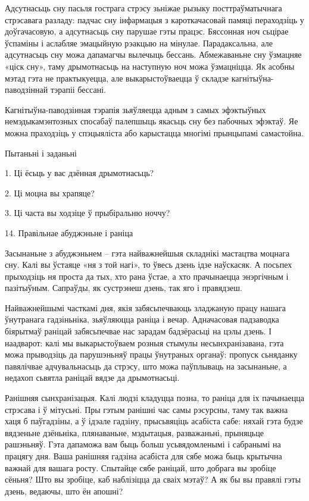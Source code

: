 Адсутнасьць сну пасьля гострага стрэсу зьніжае рызыку посттраўматычнага стрэсавага разладу: падчас сну інфармацыя з кароткачасовай памяці пераходзіць у доўгачасовую, а адсутнасьць сну парушае гэты працэс. Бяссонная ноч сьцірае ўспаміны і аслабляе эмацыйную рэакцыю на мінулае. Парадаксальна, але адсутнасьць сну можа дапамагчы вылечыць бессань. Абмежаваньне сну ўзмацняе «ціск сну», таму дрымотнасьць на наступную ноч можа ўзмацніцца. Як асобны мэтад гэта не практыкуецца, але выкарыстоўваецца ў складзе кагнітыўна-паводзіннай тэрапіі бессані.

Кагнітыўна-паводзінная тэрапія зьяўляецца адным з самых эфэктыўных немэдыкамэнтозных спосабаў палепшыць якасьць сну без пабочных эфэктаў. Яе можна праходзіць у спэцыяліста або карыстацца многімі прынцыпамі самастойна.

Пытаньні і заданьні

1. Ці ёсьць у вас дзённая дрымотнасьць?

2. Ці моцна вы храпяце?

3. Ці часта вы ходзіце ў прыбіральню ноччу?


14. Правільнае абуджэньне і раніца

Засынаньне з абуджэньнем – гэта найважнейшыя складнікі мастацтва моцнага сну. Калі вы ўстаяце «ня з той нагі», то ўвесь дзень ідзе наўскасяк. А посьпех прыходзіць ня проста да тых, хто рана ўстае, а хто прачынаецца энэргічным і пазітыўным. Сапраўды, як сустрэнеш дзень, так яго і правядзеш.

Найважнейшымі часткамі дня, якія забясьпечваюць зладжаную працу нашага ўнутранага гадзіньніка, зьяўляюцца раніца і вечар. Адначасовая падзаводка біярытмаў раніцай забясьпечвае нас зарадам бадзёрасьці на цэлы дзень. І наадварот: калі мы выкарыстоўваем розныя стымулы несынхранізавана, гэта можа прыводзіць да парушэньняў працы ўнутраных органаў: пропуск сьняданку павялічвае адчувальнасьць да стрэсу, што можа паўплываць на засынаньне, а недахоп сьвятла раніцай вядзе да дрымотнасьці.

Ранішняя сынхранізацыя. Калі людзі кладуцца позна, то раніца для іх пачынаецца стрэсава і ў мітусьні. Пры гэтым ранішні час самы рэсурсны, таму так важна хаця б паўгадзіны, а ў ідэале гадзіну, прысьвяціць асабіста сабе: няхай гэта будзе вядзеньне дзёньніка, плянаваньне, мэдытацыя, разважаньні, прыняцьце рашэньняў. Гэта дапаможа вам быць больш усьвядомленымі і сабранымі на працягу дня. Ваша ранішняя гадзіна асабіста для сябе можа быць крытычна важнай для вашага росту. Спытайце сябе раніцай, што добрага вы зробіце сёньня? Што вы зробіце, каб наблізіцца да сваіх мэтаў? А як бы вы правялі гэты дзень, ведаючы, што ён апошні?

